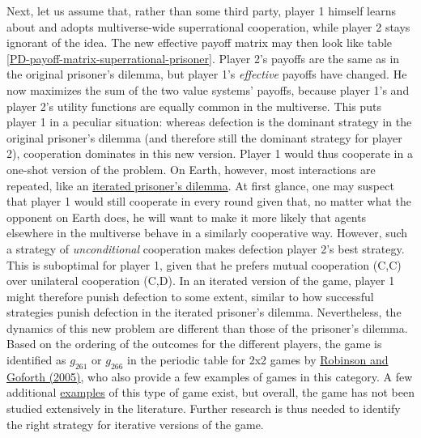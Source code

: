 Next, let us assume that, rather than some third party, player 1 himself
learns about and adopts multiverse-wide superrational cooperation, while
player 2 stays ignorant of the idea. The new effective payoff matrix may
then look like table
\ref{PD-payoff-matrix-superrational-prisoner}. Player
2's payoffs are the same as in the original prisoner's dilemma, but
player 1's \emph{effective} payoffs have changed. He now maximizes the
sum of the two value systems' payoffs, because player 1's and player 2's
utility functions are equally common in the multiverse. This puts player
1 in a peculiar situation: whereas defection is the dominant strategy in
the original prisoner's dilemma (and therefore still the dominant
strategy for player 2), cooperation dominates in this new
version.
Player 1 would thus cooperate in a one-shot
version of the problem. On Earth, however, most interactions are
repeated, like an
\href{https://en.wikipedia.org/wiki/Prisoner\%27s_dilemma\#The_iterated_prisoner.27s_dilemma}{iterated
prisoner's dilemma}. At first glance, one may suspect that player 1
would still cooperate in every round given that, no matter what the
opponent on Earth does, he will want to make it more likely that agents
elsewhere in the multiverse behave in a similarly cooperative way.
However, such a strategy of \emph{unconditional} cooperation makes
defection player 2's best strategy. This is suboptimal for player 1,
given that he prefers mutual cooperation (C,C) over unilateral
cooperation (C,D). In an iterated version of the game, player 1 might
therefore punish defection to some extent, similar to how successful
strategies punish defection in the iterated prisoner's dilemma.
Nevertheless, the dynamics of this new problem are different than those
of the prisoner's dilemma. Based on the ordering of the outcomes for the
different players, the game is identified as \(g_{261}\) or \(g_{266}\)
in the periodic table for 2x2 games by
\href{https://sl4librarian.files.wordpress.com/2016/12/goforthrobinson-the-topology-of-the-2x2-games-a-new-periodic-table.pdf}{Robinson
and Goforth (2005)}, who also provide a few examples of games in this
category. A few additional
\href{http://infidels.org/library/modern/mathew/sn-revelation.html}{examples}
of this type of game exist, but overall, the game has not been studied
extensively in the literature. Further research is thus needed to
identify the right strategy for iterative versions of the game.

